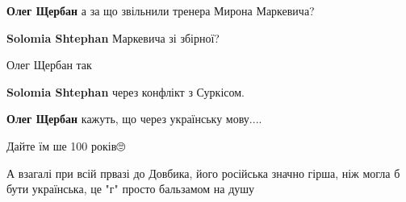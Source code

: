 \begin{itemize}
\begin{itemize}
\textbf{Олег Щербан} а за що звільнили тренера Мирона Маркевича?

 
\textbf{Solomia Shtephan} Маркевича зі збірної?

 
Олег Щербан так

 
\textbf{Solomia Shtephan} через конфлікт з Суркісом.

 
\textbf{Олег Щербан} кажуть, що через українську мову....
\end{itemize}

 

Дайте їм ше 100 років🙄

А взагалі при всій првазі до Довбика, його російська значно гірша, ніж могла б
бути українська, це "г" просто бальзамом на душу🙈

\begin{itemize}
 

\end{itemize}
\end{itemize}
